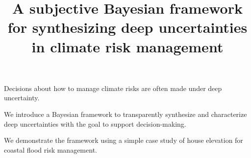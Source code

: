 \documentclass{agujournal2019}
\begin{document}
%
%


\title{A subjective Bayesian framework for synthesizing deep uncertainties in climate risk management}

%
%






\begin{keypoints}
  \item Decisions about how to manage climate risks are often made under deep uncertainty.
  \item We introduce a Bayesian framework to transparently synthesize and characterize deep uncertainties with the goal to support decision-making.
  \item We demonstrate the framework using a simple case study of house elevation for coastal flood risk management.
\end{keypoints}
\end{document}
